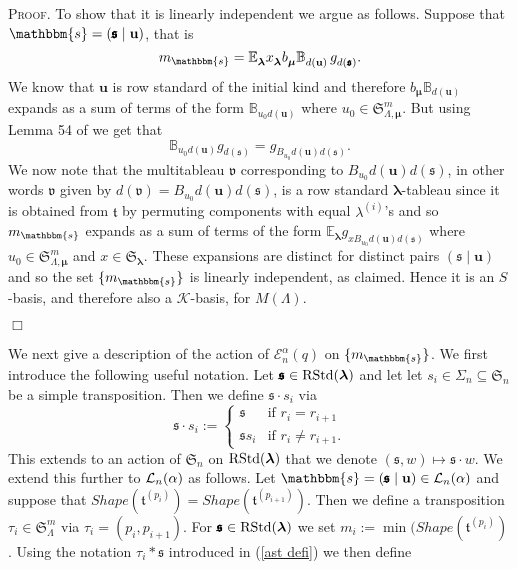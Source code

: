 \documentclass[10pt,a4,twoside,hidelinks,rm]{article}
\newcommand{\kk}{\mathcal{K}}
\newcommand{\BB}{\mathbb{B}}
\newcommand\es{\mathbbm{s}}
\newcommand\bu{\mathbf{u}}
\newcommand{\T}{\mathfrak{t}}
\newcommand{\bT}{\pmb{\mathfrak{t}}}
\newcommand{\Bs}{\pmb{\mathfrak{s}}}
\newcommand{\Bv}{\pmb{\mathfrak{v}}}
\newcommand{\Si}{\mathfrak{S}}
\newcommand{\rstd}{{\rm RStd}}
\newcommand{\Ea}{ {\mathcal E}_n^{\alpha}(q)}
\newcommand\blambda{{\boldsymbol\lambda}}
\newcommand\be{\mathbb{E}}
\newcommand\bmu{{\boldsymbol\mu}}
\theoremstyle{plain}
\newenvironment{demo}
{\textsc{Proof.}} {\quad \hfill $\Box$}
\begin{document}
\begin{demo}
To show that it is linearly independent we argue as follows.
Suppose that $ \es = ( \Bs \mid \bu) $, that is 
\begin{equation}
   m_{\es}=   { \be}^{}_{\blambda} x^{}_{\blambda}  b^{}_{\bmu}\BB^{}_{d(\bu)}  \,
g^{}_{d(\Bs)}.
\end{equation}
We know that $ \bu$ is row standard of the initial kind and therefore
$  b^{}_{\bmu}\BB^{}_{d(\bu)}  $ expands as a sum of terms of the form $ \BB^{}_{u_0d(\bu)} $ 
where $ u_0 \in  \Si^m_{\Lambda, \bmu} $. But using Lemma 54 of \cite{ER} we get that 
\begin{equation} \BB^{}_{u_0d(\bu)} g^{}_{d(\Bs)} =
 g^{}_{B_{u_0} d(\bu)    d(\Bs)}.
\end{equation}
We now note that the multitableau $ \Bv $ corresponding to $ B_{u_0} d(\bu)    d(\Bs) $, in other words
$ \Bv $ given by
$ d(\Bv) = B_{u_0} d(\bu)    d(\Bs) $, is a row standard $\blambda$-tableau since it is obtained from
$ \bT $ by permuting components with equal $ \lambda^{(i)}$'s and 
so $ m_{\es} $ expands as a sum of terms of the
form $ { \be}^{}_{\blambda}   g^{}_{x B_{u_0} d(\bu)    d(\Bs)} $ where
$ u_0 \in  \Si^m_{\Lambda, \bmu} $ and 
$ x \in \Si_{\blambda} $. These expansions are distinct for distinct pairs $  ( \Bs \mid \bu) $
and so the set $ \{m_{\es}\}$ is linearly independent, as claimed. Hence it is an $S$-basis,
and therefore also a $ \kk $-basis, for $M(\Lambda) $.


\end{demo}

\medskip
We next give a description of the action of $ \Ea $ on $ \{m_{\es}\}$. 
We first introduce the following useful notation. Let $ \Bs \in  \rstd(\blambda) $ and let 
let $ s_i \in \Sigma_n \subseteq \Si_n$ be a simple transposition. Then we define $  \Bs \cdot s_i $ via
\begin{equation}
  \Bs \cdot s_i := 
\left\{\begin{array}{ll}
\Bs  & \mbox{if  } r_i = r_{i+1}  \\
\Bs s_i & \mbox{if  } r_i \neq r_{i+1}.
  \end{array}
  \right.
\end{equation}
This extends to an action of $ \Si_n $ on $ \rstd(\blambda) $ that we denote $ (\Bs, w ) \mapsto \Bs \cdot w $.
We extend this further to $ {\cal L}_n(\alpha) $ as follows. Let $ \es =
(\Bs \mid \bu) \in  {\cal L}_n(\alpha) $ and suppose that 
$ Shape(\T^{(p_i)}) = Shape(\T^{(p_{i+1})}) $. Then we define a transposition 
$  \tau_i \in \Si_{\Lambda}^m$ via
$ \tau_i = (p_i, p_{i+1})$. 
For $ \Bs \in \rstd(\blambda) $ we set
$ m_i :=  \min(Shape(\T^{(p_i)}) $.
Using the notation $ \tau_i \ast \Bs  $ introduced in
(\ref{ast defi}) we then define
\end{document}
